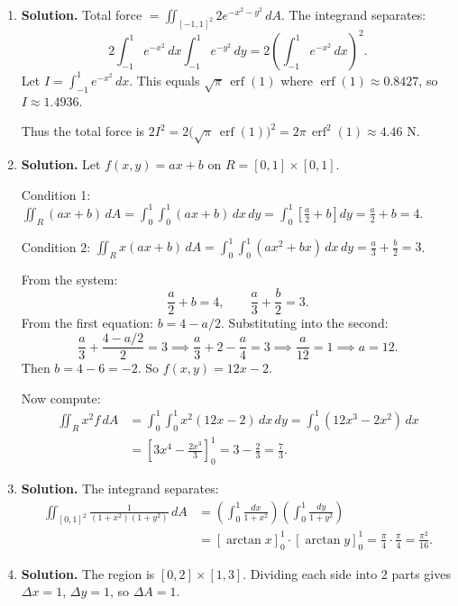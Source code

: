 \begin{enumerate}
Therefore:
\[
T_{\text{avg}} = \frac{1}{ab}\cdot\frac{2a}{\pi}\cdot\frac{2b}{\pi} = \boxed{\frac{4}{\pi^2}}.
\]

\item \textbf{Solution.}
Total force $= \displaystyle\iint_{[-1,1]^2} 2e^{-x^2-y^2}\,dA$. The integrand separates:
\[
2\int_{-1}^1 e^{-x^2}\,dx \int_{-1}^1 e^{-y^2}\,dy = 2\left(\int_{-1}^1 e^{-x^2}\,dx\right)^{\!2}.
\]
Let $I = \int_{-1}^1 e^{-x^2}\,dx$. This equals $\sqrt{\pi}\,\operatorname{erf}(1)$ where $\operatorname{erf}(1)\approx 0.8427$, so $I \approx 1.4936$.

Thus the total force is $2I^2 = 2\bigl(\sqrt{\pi}\,\operatorname{erf}(1)\bigr)^2 = \boxed{2\pi\,\operatorname{erf}^2(1)} \approx 4.46$ N.

\item \textbf{Solution.}
Let $f(x,y)=ax+b$ on $R=[0,1]\times[0,1]$.

Condition 1: $\displaystyle\iint_R (ax+b)\,dA = \int_0^1\int_0^1(ax+b)\,dx\,dy = \int_0^1\left[\frac{a}{2}+b\right]dy = \frac{a}{2}+b = 4$.

Condition 2: $\displaystyle\iint_R x(ax+b)\,dA = \int_0^1\int_0^1(ax^2+bx)\,dx\,dy = \frac{a}{3}+\frac{b}{2} = 3$.

From the system:
\[
\frac{a}{2}+b = 4, \qquad \frac{a}{3}+\frac{b}{2} = 3.
\]
From the first equation: $b = 4 - a/2$. Substituting into the second:
\[
\frac{a}{3} + \frac{4 - a/2}{2} = 3 \implies \frac{a}{3} + 2 - \frac{a}{4} = 3 \implies \frac{a}{12} = 1 \implies a = 12.
\]
Then $b = 4 - 6 = -2$. So $f(x,y) = 12x - 2$.

Now compute:
\begin{align*}
\iint_R x^2 f\,dA &= \int_0^1\int_0^1 x^2(12x-2)\,dx\,dy = \int_0^1 (12x^3 - 2x^2)\,dx \\
&= \left[3x^4 - \frac{2x^3}{3}\right]_0^1 = 3 - \frac{2}{3} = \boxed{\frac{7}{3}}.
\end{align*}

\item \textbf{Solution.}
The integrand separates:
\begin{align*}
\iint_{[0,1]^2}\frac{1}{(1+x^2)(1+y^2)}\,dA &= \left(\int_0^1\frac{dx}{1+x^2}\right)\!\left(\int_0^1\frac{dy}{1+y^2}\right) \\
&= \left[\arctan x\right]_0^1\cdot\left[\arctan y\right]_0^1
= \frac{\pi}{4}\cdot\frac{\pi}{4} = \boxed{\frac{\pi^2}{16}}.
\end{align*}

\item \textbf{Solution.}
The region is $[0,2]\times[1,3]$. Dividing each side into 2 parts gives $\Delta x = 1$, $\Delta y = 1$, so $\Delta A = 1$.


\end{enumerate}

